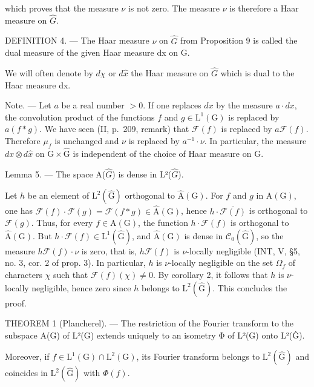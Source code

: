which proves that the measure \(\nu\) is not zero. The measure \(\nu\) is therefore a Haar measure on \(\widehat{G}\).

DEFINITION 4. --- The Haar measure \(\nu\) on \(\widehat{G}\) from Proposition 9 is called the dual measure of the given Haar measure dx on G.

We will often denote by \(d\chi\) or \(d\widehat{x}\) the Haar measure on \(\widehat{G}\) which is dual to the Haar measure dx.

Note. --- Let \(a\) be a real number \(>0\). If one replaces \(dx\) by the measure \(a \cdot dx\), the convolution product of the functions \(f\) and \(g \in \mathrm{L}^{1}(\mathrm{G})\) is replaced by \(a(f*g)\). We have seen (II, p.~209, remark) that \(\mathcal{F}(f)\) is replaced by \(a\mathcal{F}(f)\). Therefore \(\mu_{f}\) is unchanged and \(\nu\) is replaced by \(a^{-1} \cdot \nu\). In particular, the measure \(dx \otimes d\hat{x}\) on \(\mathrm{G} \times \hat{\mathrm{G}}\) is independent of the choice of Haar measure on \(\mathrm{G}\).

Lemma 5. --- The space A(\(\hat{G}\)) is dense in L²(\(\hat{G}\)).

Let \(h\) be an element of \(\mathrm{L}^2(\widehat{\mathrm{G}})\) orthogonal to \(\widehat{\mathrm{A}}(\mathrm{G})\). For \(f\) and \(g\) in \(\mathrm{A}(\mathrm{G})\), one has \(\mathcal{F}(f) \cdot \mathcal{F}(g) = \mathcal{F}(f*g) \in \widehat{\mathrm{A}}(\mathrm{G})\), hence \(h \cdot \overline{\mathcal{F}(f)}\) is orthogonal to \(\mathcal{F}(g)\). Thus, for every \(f \in \mathrm{A}(\mathrm{G})\), the function \(h \cdot \mathcal{F}(f)\) is orthogonal to \(\widehat{\mathrm{A}}(\mathrm{G})\). But \(h \cdot \mathcal{F}(f) \in \mathrm{L}^1(\widehat{\mathrm{G}})\), and \(\widehat{\mathrm{A}}(\mathrm{G})\) is dense in \(\mathcal{C}_0(\widehat{\mathrm{G}})\), so the measure \(h\mathcal{F}(f) \cdot \nu\) is zero, that is, \(h\mathcal{F}(f)\) is \(\nu\)-locally negligible (INT, V, §5, no. 3, cor. 2 of prop. 3). In particular, \(h\) is \(\nu\)-locally negligible on the set \(\Omega_f\) of characters \(\chi\) such that \(\mathcal{F}(f)(\chi) \neq 0\). By corollary 2, it follows that \(h\) is \(\nu\)-locally negligible, hence zero since \(h\) belongs to \(\mathrm{L}^2(\widehat{\mathrm{G}})\). This concludes the proof.

THEOREM 1 (Plancherel). --- The restriction of the Fourier transform to the subspace A(G) of L²(G) extends uniquely to an isometry Φ of L²(G) onto L²(Ĝ).

Moreover, if \(f \in \mathrm{L}^{1}(\mathrm{G}) \cap \mathrm{L}^{2}(\mathrm{G})\), its Fourier transform belongs to \(\mathrm{L}^{2}(\widehat{\mathrm{G}})\) and coincides in \(\mathrm{L}^{2}(\widehat{\mathrm{G}})\) with \(\Phi(f)\).

